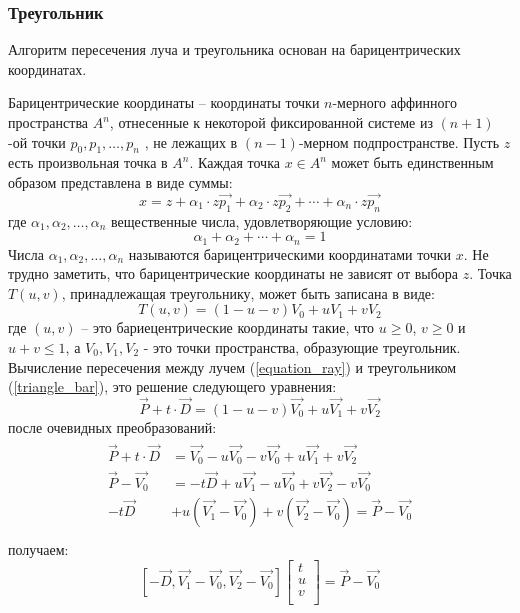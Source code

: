 \documentclass[12pt, a4paper, utf8]{article}
\begin{document}
\subsubsection{Треугольник}
Алгоритм пересечения луча и треугольника основан на барицентрических координатах.
\par
Барицентрические координаты -- координаты точки $n$-мерного аффинного пространства $A^n$, отнесенные к некоторой фиксированной системе из $(n + 1)$-ой точки $p_0, p_1, \dots, p_n$ , не лежащих в $(n -1)$-мерном подпространстве. Пусть $z$ есть произвольная точка в $A^n$. Каждая точка $x \in A^n$ может быть единственным образом представлена в виде суммы:
$$
	x = z + \alpha_1 \cdot z\vec{p_1} + \alpha_2 \cdot z\vec{p_2} + \cdots + \alpha_n \cdot z\vec{p_n} 
$$
где $\alpha_1, \alpha_2, \dots,  \alpha_n $ вещественные числа, удовлетворяющие условию:
$$
\alpha_1 + \alpha_2 + \cdots + \alpha_n  = 1
$$
Числа $\alpha_1, \alpha_2, \dots,  \alpha_n $ называются барицентрическими координатами точки $x$. Не трудно заметить, что барицентрические координаты не зависят от выбора $z$.
Точка $T(u,v)$, принадлежащая треугольнику, может быть записана в виде:
\begin{equation}
\label{triangle_bar}
T(u,v) = (1-u-v)V_0 + uV_1 + vV_2
\end{equation}
\noindent где $(u,v)$ -- это бариецентрические координаты такие, что $u \geq 0$, $v \geq 0$ и $u + v \leq 1$, а $V_0, V_1, V_2$ - это точки пространства, образующие треугольник.
Вычисление пересечения между лучем (\ref{equation_ray}) и треугольником (\ref{triangle_bar}), это решение следующего уравнения:
$$
\vec{P} + t\cdot \vec{D} = (1-u-v)\vec{V_0} + u\vec{V_1} + v\vec{V_2}
$$
после очевидных преобразований:
\begin{multline*}
\begin{split}
\vec{P} + t\cdot \vec{D} &= \vec{V_0} - u\vec{V_0} - v\vec{V_0} + u\vec{V_1} + v\vec{V_2} \\
\vec{P} - \vec{V_0} &= - t\vec{D} + u\vec{V_1} - u\vec{V_0} + v\vec{V_2} - v\vec{V_0} \\
- t\vec{D} &+ u(\vec{V_1} - \vec{V_0}) + v(\vec{V_2} - \vec{V_0}) = \vec{P} - \vec{V_0} \\
\end{split}
\end{multline*}
получаем:
\begin{equation}
\label{ray_cross_tr}
\left[ -\vec{D}, \vec{V_1} - \vec{V_0}, \vec{V_2} - \vec{V_0}\right] 
\left[  
\begin{array}{c} t \\ u \\ v \\ \end{array}
\right] = \vec{P} - \vec{V_0}
\end{equation}
\end{document}
